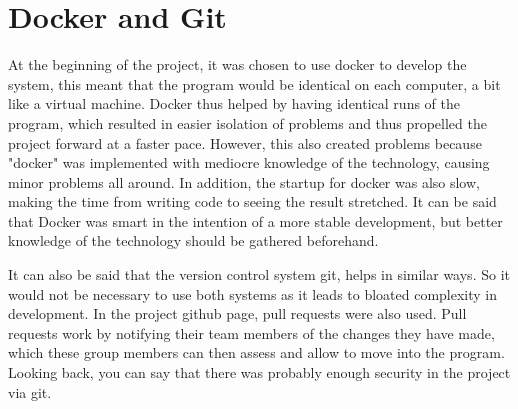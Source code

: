 \section{Docker and Git}
At the beginning of the project, it was chosen to use docker to develop the system, this meant that the program would be identical on each computer, a bit like a virtual machine.
Docker thus helped by having identical runs of the program, which resulted in easier isolation of problems and thus propelled the project forward at a faster pace.
However, this also created problems because "docker" was implemented with mediocre knowledge of the technology, causing minor problems all around.
In addition, the startup for docker was also slow, making the time from writing code to seeing the result stretched.
It can be said that Docker was smart in the intention of a more stable development, but better knowledge of the technology should be gathered beforehand.

It can also be said that the version control system git, helps in similar ways.
So it would not be necessary to use both systems as it leads to bloated complexity in development.
In the project github page, pull requests were also used.
Pull requests work by notifying their team members of the changes they have made, which these group members can then assess and allow to move into the program.
Looking back, you can say that there was probably enough security in the project via git.


